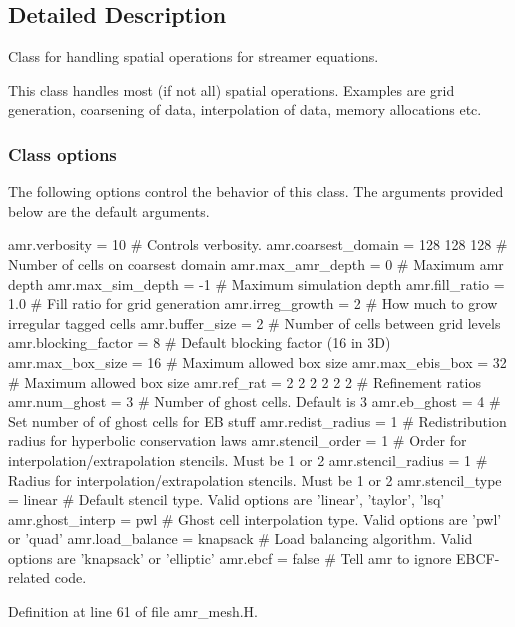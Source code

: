 \subsection{Detailed Description}
Class for handling spatial operations for streamer equations. 

This class handles most (if not all) spatial operations. Examples are grid generation, coarsening of data, interpolation of data, memory allocations etc.

\subsubsection*{Class options }

The following options control the behavior of this class. The arguments provided below are the default arguments. \begin{DoxyVerb}amr.verbosity       = 10          # Controls verbosity. 
amr.coarsest_domain = 128 128 128 # Number of cells on coarsest domain
amr.max_amr_depth   = 0           # Maximum amr depth
amr.max_sim_depth   = -1          # Maximum simulation depth
amr.fill_ratio      = 1.0         # Fill ratio for grid generation
amr.irreg_growth    = 2           # How much to grow irregular tagged cells
amr.buffer_size     = 2           # Number of cells between grid levels
amr.blocking_factor = 8           # Default blocking factor (16 in 3D)
amr.max_box_size    = 16          # Maximum allowed box size
amr.max_ebis_box    = 32          # Maximum allowed box size
amr.ref_rat         = 2 2 2 2 2 2 # Refinement ratios
amr.num_ghost       = 3           # Number of ghost cells. Default is 3
amr.eb_ghost        = 4           # Set number of of ghost cells for EB stuff
amr.redist_radius   = 1           # Redistribution radius for hyperbolic conservation laws
amr.stencil_order   = 1           # Order for interpolation/extrapolation stencils. Must be 1 or 2
amr.stencil_radius  = 1           # Radius for interpolation/extrapolation stencils. Must be 1 or 2
amr.stencil_type    = linear      # Default stencil type. Valid options are 'linear', 'taylor', 'lsq'
amr.ghost_interp    = pwl         # Ghost cell interpolation type. Valid options are 'pwl' or 'quad'
amr.load_balance    = knapsack    # Load balancing algorithm. Valid options are 'knapsack' or 'elliptic'
amr.ebcf            = false       # Tell amr to ignore EBCF-related code. \end{DoxyVerb}
 

Definition at line 61 of file amr\+\_\+mesh.\+H.




